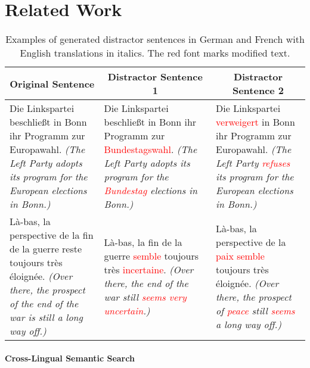 \section{Related Work}
\begin{table*}[t]
    \centering 
    \begin{tabular}{p{}@{\hskip 0.05in}|p{}@{\hskip 0.05in}|p{}}
        \multicolumn{1}{c|}{Original Sentence} &
        \multicolumn{1}{c|}{Distractor Sentence 1} & \multicolumn{1}{c}{Distractor Sentence 2} \\ 
        \toprule
      Die Linkspartei beschließt in Bonn ihr Programm zur Europawahl. \newline\textit{(The Left Party adopts its program for the European elections in Bonn.)} & Die Linkspartei beschließt in Bonn ihr Programm zur \textcolor{red}{Bundestagswahl}. \newline\textit{(The Left Party adopts its program for the \textcolor{red}{Bundestag} elections in Bonn.)}& Die Linkspartei \textcolor{red}{verweigert} in Bonn ihr Programm zur Europawahl. \newline\textit{(The Left Party \textcolor{red}{refuses} its program for the European elections in Bonn.)}\\
      \midrule
      Là-bas, la perspective de la fin de la guerre reste toujours très éloignée. \newline\textit{(Over there, the prospect of the end of the war is still a long way off.)}& Là-bas, la fin de la guerre \textcolor{red}{semble} toujours très \textcolor{red}{incertaine}. \newline\textit{(Over there, the end of the war still \textcolor{red}{seems very uncertain}.)}& Là-bas, la perspective de la \textcolor{red}{paix semble} toujours très éloignée. \newline\textit{(Over there, the prospect of \textcolor{red}{peace} still \textcolor{red}{seems} a long way off.)}\\
      \bottomrule
    \end{tabular}
    \caption{Examples of generated distractor sentences in German and French with English translations in italics. The red font marks modified text.}
    \label{tab:transformation-examples}
\end{table*}

\paragraph{\textbf{Cross-Lingual Semantic Search}}

